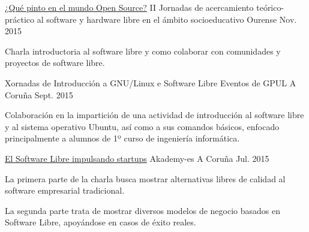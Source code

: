 


\begin{cventries}


\cventry
{\href{http://castrinho8.github.io/open-community/#/}{¿Qué pinto en el mundo Open Source?}} %
{II Jornadas de acercamiento teórico-práctico al software y hardware libre en 
el ámbito socioeducativo} %
{Ourense} %
{Nov. 2015} %
{ %
\begin{cvitems}
\item {Charla introductoria al software libre y como colaborar con comunidades y proyectos de software libre.}
\end{cvitems}
}


\cventry
{Xornadas de Introducción a GNU/Linux e Software Libre} %
{Eventos de GPUL} %
{A Coruña} %
{Sept. 2015} %
{ %
\begin{cvitems}
\item {Colaboración en la impartición de una actividad de introducción al software libre y al sistema operativo Ubuntu, así como a sus comandos básicos, enfocado
principalmente a alumnos de 1º curso de ingeniería informática.}
\end{cvitems}
}


\cventry
{\href{http://castrinho8.github.io/akademy-startups-presentation/#/portada}{El Software Libre impulsando startups}} %
{Akademy-es} %
{A Coruña} %
{Jul. 2015} %
{ %
\begin{cvitems}
\item {La primera parte de la charla busca mostrar alternativas libres de calidad al software empresarial tradicional.}
\item {La segunda parte trata de mostrar diversos modelos de negocio basados en Software Libre, apoyándose en casos de éxito reales.}
\end{cvitems}
}



\end{cventries}